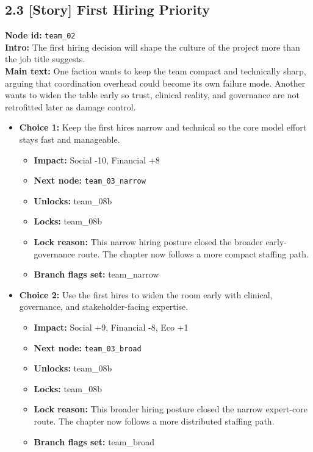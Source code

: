 \documentclass[11pt]{article}
\begin{document}
\subsection*{2.3 [Story] First Hiring Priority}
\textbf{Node id:} \texttt{team\_02}\\
\textbf{Intro:} The first hiring decision will shape the culture of the project more than the job title suggests.\\
\textbf{Main text:} One faction wants to keep the team compact and technically sharp, arguing that coordination overhead could become its own failure mode. Another wants to widen the table early so trust, clinical reality, and governance are not retrofitted later as damage control.\\
\begin{itemize}
\item \textbf{Choice 1:} Keep the first hires narrow and technical so the core model effort stays fast and manageable.
\begin{itemize}
\item \textbf{Impact:} Social -10, Financial +8
\item \textbf{Next node:} \texttt{team\_03\_narrow}
\item \textbf{Unlocks:} team\_08b
\item \textbf{Locks:} team\_08b
\item \textbf{Lock reason:} This narrow hiring posture closed the broader early-governance route. The chapter now follows a more compact staffing path.
\item \textbf{Branch flags set:} team\_narrow
\end{itemize}
\item \textbf{Choice 2:} Use the first hires to widen the room early with clinical, governance, and stakeholder-facing expertise.
\begin{itemize}
\item \textbf{Impact:} Social +9, Financial -8, Eco +1
\item \textbf{Next node:} \texttt{team\_03\_broad}
\item \textbf{Unlocks:} team\_08b
\item \textbf{Locks:} team\_08b
\item \textbf{Lock reason:} This broader hiring posture closed the narrow expert-core route. The chapter now follows a more distributed staffing path.
\item \textbf{Branch flags set:} team\_broad
\end{itemize}
\end{itemize}
\end{document}
